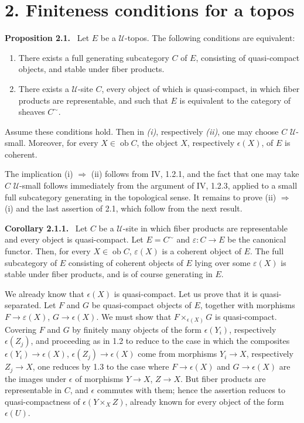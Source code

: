 \documentclass[11pt]{article}
\newcommand{\U}{\mathcal{U}}
\newcommand{\ob}{\operatorname{ob}}
\newenvironment{statement}[1]{\par\medskip\noindent\textbf{#1.}\ }{\par\medskip}
\begin{document}
\section*{2. Finiteness conditions for a topos}

\begin{statement}{Proposition 2.1}
Let \(E\) be a \(\U\)-topos. The following conditions are equivalent:
\begin{enumerate}[label=(\roman*)]
\item There exists a full generating subcategory \(C\) of \(E\), consisting of quasi-compact objects, and stable under fiber products.
\item There exists a \(\U\)-site \(C\), every object of which is quasi-compact, in which fiber products are representable, and such that \(E\) is equivalent to the category of sheaves \(C^\sim\).
\end{enumerate}
Assume these conditions hold. Then in \emph{(i)}, respectively \emph{(ii)}, one may choose \(C\) \(\U\)-small. Moreover, for every \(X\in\ob C\), the object \(X\), respectively \(\epsilon(X)\), of \(E\) is coherent.
\end{statement}

The implication (i) \(\Rightarrow\) (ii) follows from IV, 1.2.1, and the fact that one may take \(C\) \(\U\)-small follows immediately from the argument of IV, 1.2.3, applied to a small full subcategory generating in the topological sense. It remains to prove (ii) \(\Rightarrow\) (i) and the last assertion of 2.1, which follow from the next result.

\begin{statement}{Corollary 2.1.1}
Let \(C\) be a \(\U\)-site in which fiber products are representable and every object is quasi-compact. Let \(E=C^\sim\) and \(\varepsilon:C\to E\) be the canonical functor. Then, for every \(X\in\ob C\), \(\varepsilon(X)\) is a coherent object of \(E\). The full subcategory of \(E\) consisting of coherent objects of \(E\) lying over some \(\varepsilon(X)\) is stable under fiber products, and is of course generating in \(E\).
\end{statement}

We already know that \(\epsilon(X)\) is quasi-compact. Let us prove that it is quasi-separated. Let \(F\) and \(G\) be quasi-compact objects of \(E\), together with morphisms \(F\to\varepsilon(X)\), \(G\to\epsilon(X)\). We must show that \(F\times_{\epsilon(X)}G\) is quasi-compact. Covering \(F\) and \(G\) by finitely many objects of the form \(\epsilon(Y_i)\), respectively \(\epsilon(Z_j)\), and proceeding as in 1.2 to reduce to the case in which the composites \(\epsilon(Y_i)\to\epsilon(X)\), \(\epsilon(Z_j)\to\epsilon(X)\) come from morphisms \(Y_i\to X\), respectively \(Z_j\to X\), one reduces by 1.3 to the case where \(F\to\epsilon(X)\) and \(G\to\epsilon(X)\) are the images under \(\epsilon\) of morphisms \(Y\to X\), \(Z\to X\). But fiber products are representable in \(C\), and \(\epsilon\) commutes with them; hence the assertion reduces to quasi-compactness of \(\epsilon(Y\times_X Z)\), already known for every object of the form \(\epsilon(U)\).
\end{document}

